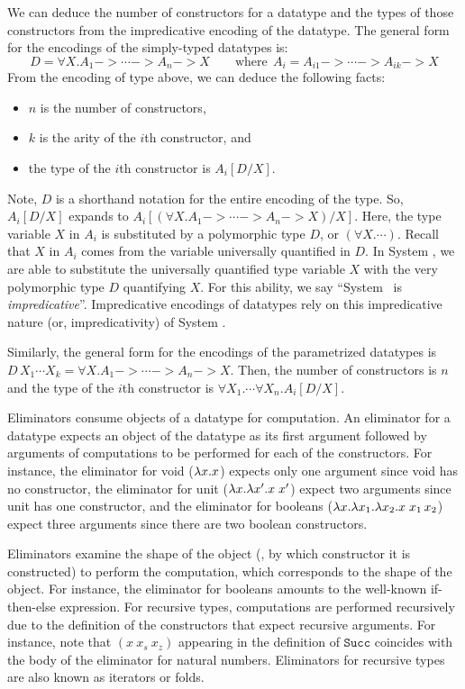 We can deduce the number of constructors for a datatype and the types
of those constructors from the impredicative encoding of the datatype.
The general form for the encodings of the simply-typed datatypes is:
\[D = \forall X. A_1 -> \cdots -> A_n -> X
	\qquad\text{where}~~ A_i = A_{i1} -> \cdots -> A_{ik} -> X \]
From the encoding of type above, we can deduce the following facts:
\begin{itemize}
\item $n$ is the number of constructors,
\item $k$ is the arity of the $i$th constructor, and
\item the type of the $i$th constructor is $A_i[D/X]$.
\end{itemize}
Note, $D$ is a shorthand notation for the entire encoding of the type.
So, $A_i[D/X]$ expands to $A_i[(\forall X. A_1 -> \cdots -> A_n -> X)/ X]$.
Here, the type variable $X$ in $A_i$ is substituted by a polymorphic type
$D$, or $(\forall X. \cdots)$. Recall that $X$ in $A_i$ comes from
the variable universally quantified in $D$. In System \F, we are able to
substitute the universally quantified type variable $X$ with
the very polymorphic type $D$ quantifying $X$. For this ability,
we say ``System \F\ is \emph{impredicative}''. Impredicative encodings
of datatypes rely on this impredicative nature (or, impredicativity)
of System \F.

Similarly, the general form for the encodings of the parametrized datatypes is
$D\,X_1 \cdots X_k = \forall X. A_1 -> \cdots -> A_n -> X$. Then,
the number of constructors is $n$ and the type of the $i$th constructor
is $\forall X_1.\cdots\forall X_n.A_i[D/X]$.

Eliminators consume objects of a datatype for computation.
An eliminator for a datatype expects an object of the datatype
as its first argument followed by arguments of computations
to be performed for each of the constructors. For instance, the eliminator
for void ($\lambda x.x$) expects only one argument since void has
no constructor, the eliminator for unit ($\lambda x.\lambda x'.x\;x'$) expect
two arguments since unit has one constructor, and the eliminator for booleans
($\lambda x.\lambda x_1. \lambda x_2. x\;x_1\,x_2$) expect three arguments since there are
two boolean constructors.

Eliminators examine the shape of the object (\ie, by which constructor it is
constructed) to perform the computation, which corresponds to the shape
of the object. For instance, the eliminator for booleans amounts to the
well-known if-then-else expression.
For recursive types, computations are performed recursively due to
the definition of the constructors that expect recursive arguments.
For instance, note that $(x~x_s~x_z)$ appearing in the definition of
$\mathtt{Succ}$ coincides with the body of the eliminator for natural numbers.
Eliminators for recursive types are also known as iterators or folds.

